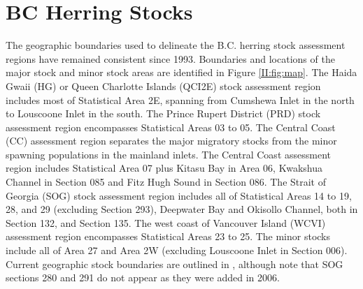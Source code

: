 \section{BC Herring Stocks}
The geographic boundaries used to delineate the B.C. herring stock assessment regions have remained consistent since 1993.  Boundaries and locations of the major stock and minor stock areas are identified in Figure \ref{II:fig:map}.  The Haida Gwaii (HG) or Queen Charlotte Islands (QCI2E) stock assessment region includes most of Statistical Area 2E, spanning from Cumshewa Inlet in the north to Louscoone Inlet in the south.  The Prince Rupert District (PRD) stock assessment region encompasses Statistical Areas 03 to 05.  The Central Coast (CC) assessment region separates the major migratory stocks from the minor spawning populations in the mainland inlets.  The Central Coast assessment region includes Statistical Area 07 plus Kitasu Bay in Area 06, Kwakshua Channel in Section 085 and Fitz Hugh Sound in Section 086.  The Strait of Georgia (SOG) stock assessment region includes all of Statistical Areas 14 to 19, 28, and 29 (excluding Section 293), Deepwater Bay and Okisollo Channel, both in Section 132, and Section 135.  The west coast of Vancouver Island (WCVI) assessment region encompasses Statistical Areas 23 to 25.  The minor stocks include all of Area 27 and Area 2W (excluding Louscoone Inlet in Section 006).  Current geographic stock boundaries are outlined in \cite{Midgley:2003fk}, although note that SOG sections 280 and 291 do not appear as they were added in 2006.

